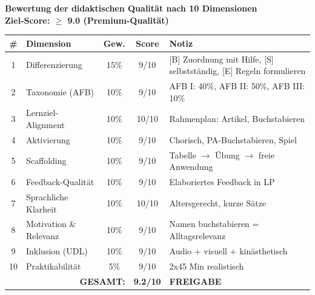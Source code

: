 \documentclass[11pt,a4paper]{article}
\begin{document}
\begin{scorebox}
\textbf{Bewertung der didaktischen Qualität nach 10 Dimensionen}\\
\textbf{Ziel-Score: $\geq$ 9.0 (Premium-Qualität)}

\vspace{1em}
\begin{tabular}{|c|l|c|c|p{4.5cm}|}
\hline
\textbf{\#} & \textbf{Dimension} & \textbf{Gew.} & \textbf{Score} & \textbf{Notiz} \\
\hline
1 & Differenzierung & 15\% & 9/10 & [B] Zuordnung mit Hilfe, [S] selbstständig, [E] Regeln formulieren \\
\hline
2 & Taxonomie (AFB) & 10\% & 9/10 & AFB I: 40\%, AFB II: 50\%, AFB III: 10\% \\
\hline
3 & Lernziel-Alignment & 10\% & 10/10 & Rahmenplan: Artikel, Buchstabieren \\
\hline
4 & Aktivierung & 10\% & 9/10 & Chorisch, PA-Buchstabieren, Spiel \\
\hline
5 & Scaffolding & 10\% & 9/10 & Tabelle $\rightarrow$ Übung $\rightarrow$ freie Anwendung \\
\hline
6 & Feedback-Qualität & 10\% & 9/10 & Elaboriertes Feedback in LP \\
\hline
7 & Sprachliche Klarheit & 10\% & 10/10 & Altersgerecht, kurze Sätze \\
\hline
8 & Motivation \& Relevanz & 10\% & 9/10 & Namen buchstabieren = Alltagsrelevanz \\
\hline
9 & Inklusion (UDL) & 10\% & 9/10 & Audio + visuell + kinästhetisch \\
\hline
10 & Praktikabilität & 5\% & 9/10 & 2x45 Min realistisch \\
\hline
\multicolumn{3}{|r|}{\textbf{GESAMT:}} & \textbf{9.2/10} & \textcolor{successgreen}{\textbf{FREIGABE}} \\
\hline
\end{tabular}
\end{scorebox}
\end{document}
